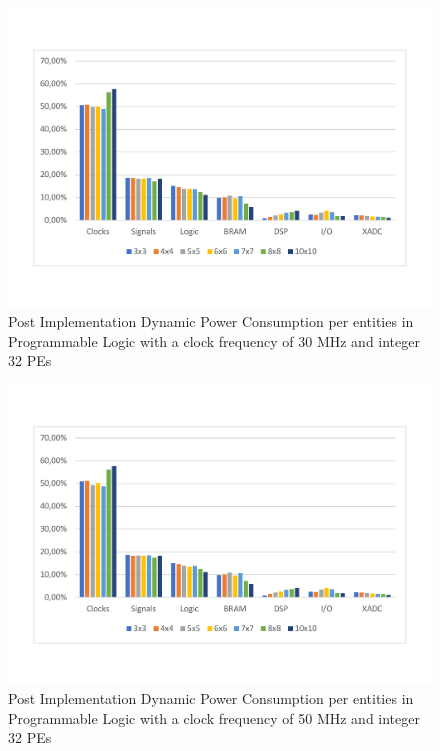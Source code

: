 \begin{itemize}
\begin{figure}[!htbp]
\end{figure}
\begin{figure}[!htbp]
\centering
\captionsetup{justification=centering}
\includegraphics[scale=0.6,angle=0]{./figure/graphs/power_pldyn_div_int32_freq_30mhz.pdf}
\caption{Post Implementation Dynamic Power Consumption per entities in Programmable Logic with a clock frequency of 30 MHz and integer 32 PEs}
\label{fig:dynpowint32ent30}
\end{figure}
\begin{figure}[!htbp]
\centering
\captionsetup{justification=centering}
\includegraphics[scale=0.6,angle=0]{./figure/graphs/power_pldyn_div_int32_freq_50mhz.pdf}
\caption{Post Implementation Dynamic Power Consumption per entities in Programmable Logic with a clock frequency of 50 MHz and integer 32 PEs}
\label{fig:dynpowint32ent50}

\end{figure}
\end{itemize}
